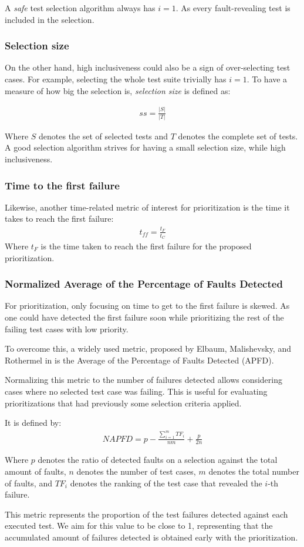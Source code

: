 A \emph{safe} test selection algorithm \cite{366926} always has $i = 1$. As every fault-revealing test is included in the selection.

\subsubsection{Selection size}
On the other hand, high inclusiveness could also be a sign of over-selecting test cases. For example, selecting the whole test
suite trivially has $i=1$. To have a measure of how big the selection is, \emph{selection size} is defined as:

\begin{align*}
    ss = \frac{|S|}{|T|}
\end{align*}

Where $S$ denotes the set of selected tests and $T$ denotes the complete set of tests.
A good selection algorithm strives for having a small selection size, while high inclusiveness.

\subsubsection{Time to the first failure}
Likewise, another time-related metric of interest for prioritization is the time it takes to reach the first failure:
\begin{align*}
    t_{ff} = \frac{t_F}{t_C}
\end{align*}
Where $t_F$ is the time taken to reach the first failure for the proposed prioritization.

\subsubsection{Normalized Average of the Percentage of Faults Detected}
For prioritization, only focusing on time to get to the first failure is skewed. As one could have detected the first failure
soon while prioritizing the rest of the failing test cases with low priority.

To overcome this, a widely used metric, proposed by Elbaum, Malishevsky, and Rothermel in \cite{elbaum2002} is the 
Average of the Percentage of Faults Detected (APFD).

Normalizing this metric to the number of failures detected allows considering cases where no
selected test case was failing. This is useful for evaluating prioritizations that had previously some selection criteria applied.

It is defined by:
\begin{align*}
NAPFD = p - \frac{\sum_{i=1}^mTF_i}{nm} + \frac{p}{2n}
\end{align*}

Where $p$ denotes the ratio of detected faults on a selection against the total amount of faults,
$n$ denotes the number of test cases, $m$ denotes the total number of faults, and $TF_i$ denotes the ranking of
the test case that revealed the $i$-th failure.

This metric represents the proportion of the test failures detected against each executed test.
We aim for this value to be close to 1, representing that the accumulated amount of 
failures detected is obtained early with the prioritization.